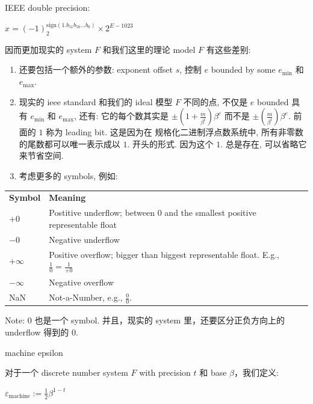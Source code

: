 IEEE double precision:

\(x = \left( {- 1} \right)_{2}^{\text{sign}{({1.b_{51}b_{50}\ldots b_{0}})}} \times 2^{E - 1023}\)

因而更加现实的 system \(F\) 和我们这里的理论 model \(F\) 有这些差别:

\begin{enumerate}
\tightlist
\item
  还要包括一个额外的参数: exponent offset \(s\), 控制 \(e\) bounded by some \(e_{\text{min}}\) 和 \(e_{\text{max}}\).
\item
  现实的 ieee standard 和我们的 ideal 模型 \(F\) 不同的点, 不仅是 \(e\) bounded 具有 \(e_{\text{min}}\) 和 \(e_{\text{max}}\), 还有: 它的每个数其实是 \(\pm \left( {1 + \frac{m}{\beta^{t}}} \right)\beta^{e}\) 而不是 \(\pm \left( \frac{m}{\beta^{t}} \right)\beta^{e}\). 前面的 \(1\) 称为 leading bit. 这是因为在 规格化二进制浮点数系统中, 所有非零数的尾数都可以唯一表示成以 \(1.\) 开头的形式. 因为这个 \(1.\) 总是存在, 可以省略它来节省空间.
\item
  考虑更多的 symbols, 例如:
\end{enumerate}

{\def\LTcaptype{none} %
\begin{longtable}[]{@{}ll@{}}
\toprule\noalign{}
\endhead
\bottomrule\noalign{}
\endlastfoot
\textbf{Symbol} & \textbf{Meaning} \\
\(+ 0\) & Postitive underflow; between \(0\) and the smallest positive representable float \\
\(- 0\) & Negative underflow \\
\(+ \infty\) & Positive overflow; bigger than biggest representable float. E.g., \(\frac{1}{0} = \frac{1}{+ 0}\) \\
\(- \infty\) & Negative overflow \\
NaN & Not-a-Number, e.g., \(\frac{0}{0}\). \\
\end{longtable}
}

Note: \(0\) 也是一个 symbol. 并且，现实的 system 里，还要区分正负方向上的 underflow 得到的 \(0\).

\begin{definition}{machine epsilon}

对于一个 discrete number system \(F\) with precision \(t\) 和 base \(\beta\)，我们定义:

\(\varepsilon_{\text{machine}} := \frac{1}{2}\beta^{1 - t}\)

\end{definition}

